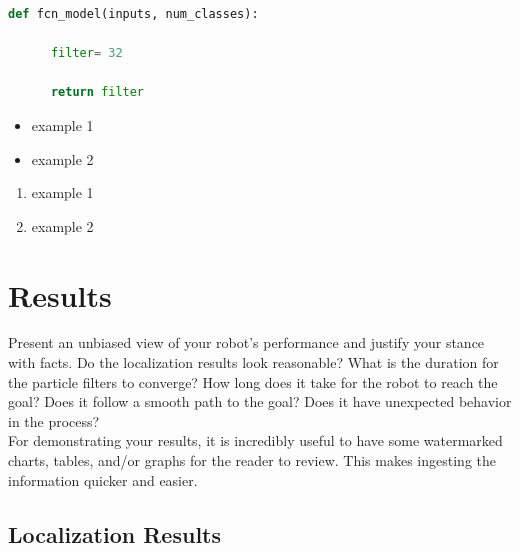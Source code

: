 \documentclass[10pt,journal,compsoc]{IEEEtran}
\begin{document}
\begin{lstlisting}[language=Python, caption=Fully convolutional network code]
def fcn_model(inputs, num_classes):

      filter= 32
      
      return filter
\end{lstlisting}

\begin{itemize}
      \item example 1
      \item example 2
      \end {itemize}
      
      \begin{enumerate}
      \item example 1
      \item example 2
      \end{enumerate}

\section{Results}
Present an unbiased view of your robot's performance and justify your stance with facts. Do the localization results look reasonable? What is the duration for the particle filters to converge? How long does it take for the robot to reach the goal? Does it follow a smooth path to the goal? Does it have unexpected behavior in the process? \\
For demonstrating your results, it is incredibly useful to have some watermarked charts, tables, and/or graphs for the reader to review. This makes ingesting the information quicker and easier.
\subsection{Localization Results}
\end{document}

